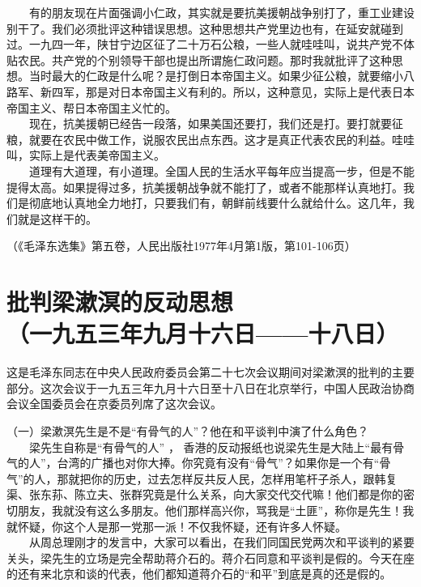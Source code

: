 \documentclass[cn,11pt,chinese]{elegantbook}
\def\myformat#1{\hfil\hfil #1}
\begin{document}
　　有的朋友现在片面强调小仁政，其实就是要抗美援朝战争别打了，重工业建设别干了。我们必须批评这种错误思想。这种思想共产党里边也有，在延安就碰到过。一九四一年，陕甘宁边区征了二十万石公粮，一些人就哇哇叫，说共产党不体贴农民。共产党的个别领导干部也提出所谓施仁政问题。那时我就批评了这种思想。当时最大的仁政是什么呢？是打倒日本帝国主义。如果少征公粮，就要缩小八路军、新四军，那是对日本帝国主义有利的。所以，这种意见，实际上是代表日本帝国主义、帮日本帝国主义忙的。\\
　　现在，抗美援朝已经告一段落，如果美国还要打，我们还是打。要打就要征粮，就要在农民中做工作，说服农民出点东西。这才是真正代表农民的利益。哇哇叫，实际上是代表美帝国主义。\\
　　道理有大道理，有小道理。全国人民的生活水平每年应当提高一步，但是不能提得太高。如果提得过多，抗美援朝战争就不能打了，或者不能那样认真地打。我们是彻底地认真地全力地打，只要我们有，朝鲜前线要什么就给什么。这几年，我们就是这样干的。\\
\begin{flushright}（《毛泽东选集》第五卷，人民出版社1977年4月第1版，第101-106页）\end{flushright}
\newpage\section*{\myformat{批判梁漱溟的反动思想}\\\myformat{（一九五三年九月十六日——十八日）}}
\begin{introduction}\item  这是毛泽东同志在中央人民政府委员会第二十七次会议期间对梁漱溟的批判的主要部分。这次会议于一九五三年九月十六日至十八日在北京举行，中国人民政治协商会议全国委员会在京委员列席了这次会议。\end{introduction}
（一）梁漱溟先生是不是“有骨气的人”？他在和平谈判中演了什么角色？\\
　　梁先生自称是“有骨气的人” ， 香港的反动报纸也说梁先生是大陆上“最有骨气的人”，台湾的广播也对你大捧。你究竟有没有“骨气”？如果你是一个有“骨气”的人，那就把你的历史，过去怎样反共反人民，怎样用笔杆子杀人，跟韩复渠、张东荪、陈立夫、张群究竟是什么关系，向大家交代交代嘛！他们都是你的密切朋友，我就没有这么多朋友。他们那样高兴你，骂我是“土匪”，称你是先生！我就怀疑，你这个人是那一党那一派！不仅我怀疑，还有许多人怀疑。\\
　　从周总理刚才的发言中，大家可以看出，在我们同国民党两次和平谈判的紧要关头，梁先生的立场是完全帮助蒋介石的。蒋介石同意和平谈判是假的。今天在座的还有来北京和谈的代表，他们都知道蒋介石的“和平”到底是真的还是假的。\\
\end{document}
